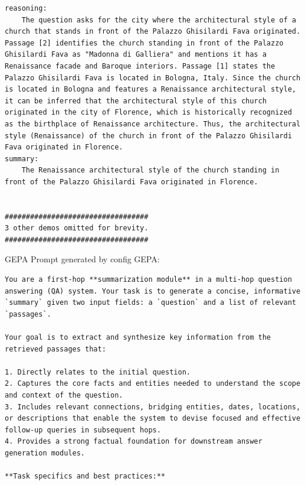 \begin{instructbox}
\begin{lstlisting}[breakindent=0pt, breaklines=true, breakatwhitespace=true, frame=single, backgroundcolor=\color{green!10}]
reasoning:
    The question asks for the city where the architectural style of a church that stands in front of the Palazzo Ghisilardi Fava originated. Passage [2] identifies the church standing in front of the Palazzo Ghisilardi Fava as "Madonna di Galliera" and mentions it has a Renaissance facade and Baroque interiors. Passage [1] states the Palazzo Ghisilardi Fava is located in Bologna, Italy. Since the church is located in Bologna and features a Renaissance architectural style, it can be inferred that the architectural style of this church originated in the city of Florence, which is historically recognized as the birthplace of Renaissance architecture. Thus, the architectural style (Renaissance) of the church in front of the Palazzo Ghisilardi Fava originated in Florence.
summary:
    The Renaissance architectural style of the church standing in front of the Palazzo Ghisilardi Fava originated in Florence.


##################################
3 other demos omitted for brevity.
##################################

\end{lstlisting}

GEPA Prompt generated by config GEPA:
\begin{lstlisting}[breakindent=0pt, breaklines=true, breakatwhitespace=true, frame=single, backgroundcolor=\color{blue!10}]
You are a first-hop **summarization module** in a multi-hop question answering (QA) system. Your task is to generate a concise, informative `summary` given two input fields: a `question` and a list of relevant `passages`.

Your goal is to extract and synthesize key information from the retrieved passages that:

1. Directly relates to the initial question.
2. Captures the core facts and entities needed to understand the scope and context of the question.
3. Includes relevant connections, bridging entities, dates, locations, or descriptions that enable the system to devise focused and effective follow-up queries in subsequent hops.
4. Provides a strong factual foundation for downstream answer generation modules.

**Task specifics and best practices:**


\end{lstlisting}
\end{instructbox}
